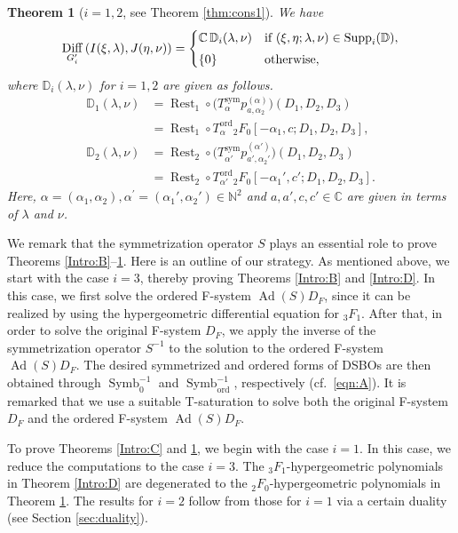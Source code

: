 \documentclass[a4paper,11pt,reqno]{amsart}
\newcommand{\CC}{\mathbb{C}}
\newcommand{\DD}{\mathbb{D}}
\newcommand{\NN}{\mathbb{N}}
\newcommand{\0}{{\bf 0}}
\newcommand{\1}{{\bf 1}}
\DeclareMathOperator{\Ad}{Ad}
\newcommand{\ord}{{\mathrm{ord}}}
\DeclareMathOperator{\Supp}{Supp}
\DeclareMathOperator{\Diff}{Diff}
\DeclareMathOperator{\Symb}{Symb}
\DeclareMathOperator{\Rest}{Rest}
\theoremstyle{plain}
\newtheorem{thmalph}{Theorem}
\theoremstyle{definition}
\numberwithin{equation}{section}
\theoremstyle{definition}
\begin{document}
\begin{thmalph}[$i=1,2$, see Theorem \ref{thm:cons1}]
\label{Intro:E}
We have 
\begin{equation*}
\Diff_{G_i^\prime}\left(I(\xi, \lambda), J(\eta, \nu)\right)
=
\begin{cases}
\CC\, \DD_i(\lambda, \nu) & 
\textnormal{if $(\xi, \eta; \lambda, \nu) \in \Supp_{i}(\DD)$},\\[3pt]
\{0\} & \textnormal{otherwise},
\end{cases}
\end{equation*}
where $\DD_i(\lambda, \nu)$ for $i=1,2$ are given as follows.
\vspace{5pt}
\begin{align*}
\DD_1(\lambda,\nu)
&=\Rest_1\circ
\big(T^{\mathrm{sym}}_{\alpha}
p_{a,\alpha_2}^{(\alpha)}\big)(D_1,D_2,D_3)\\[5pt]
&=\Rest_1\circ 
T^\ord_{\alpha}{}_2F_0
[-\alpha_1, c;  D_1, D_2, D_3],\\[10pt]
\DD_2(\lambda,\nu)
&=\Rest_2\circ 
\big(T^{\mathrm{sym}}_{\alpha'}
p_{a',\alpha_2'}^{(\alpha')}\big)(D_1,D_2,D_3) \\[5pt]
&=\Rest_2\circ  
T^\ord_{\alpha'}
{}_2F_0[-\alpha_1', c';D_1, D_2, D_3].
\end{align*}
Here, $\alpha=(\alpha_1,\alpha_2),\alpha^\prime=(\alpha_1',\alpha_2')\in \NN^2$ and $a,a',c,c'\in \CC$ are given in terms of $\lambda$ and $\nu$.
\end{thmalph}

We remark that the symmetrization operator $S$ plays an essential role to prove 
Theorems \ref{Intro:B}--\ref{Intro:E}. Here is an outline of our strategy.
As mentioned above, we start with the case $i=3$, thereby proving
Theorems \ref{Intro:B} and \ref{Intro:D}.
In this case, 
we first solve the ordered F-system $\Ad(S)D_F$, since it can be realized by using
the hypergeometric differential equation for ${}_3F_1$. After that, in order to solve the original F-system $D_F$,
we apply the inverse of the symmetrization operator $S^{-1}$ to the solution to the ordered F-system 
$\Ad(S)D_F$.
The desired symmetrized and ordered forms of DSBOs 
are then obtained through $\Symb_{0}^{-1}$ and $\Symb_{\ord}^{-1}$, respectively
(cf.\ \eqref{eqn:A}).
It is remarked that we use a suitable T-saturation to solve 
both the original F-system $D_F$ and the ordered F-system $\Ad(S)D_F$.

To prove Theorems \ref{Intro:C} and \ref{Intro:E}, we begin with the case $i=1$.
In this case, we reduce the computations to the case $i=3$.
The ${}_3F_1$-hypergeometric polynomials in Theorem \ref{Intro:D} 
are degenerated to the ${}_2F_0$-hypergeometric polynomials
in Theorem \ref{Intro:E}.
The results for $i=2$ follow from those for $i=1$ via a certain duality 
(see Section \ref{sec:duality}). 
\end{document}
